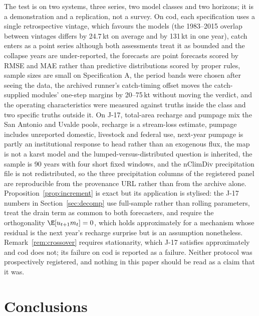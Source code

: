 The test is on two systems, three series, two model classes and two horizons; it is a demonstration and a replication, not a survey. On cod, each specification uses a single retrospective vintage, which favours the models (the 1983--2015 overlap between vintages differs by 24.7\,kt on average and by 131\,kt in one year), catch enters as a point series although both assessments treat it as bounded and the collapse years are under-reported, the forecasts are point forecasts scored by RMSE and MAE rather than predictive distributions scored by proper rules, sample sizes are small on Specification A, the period bands were chosen after seeing the data, the archived runner's catch-timing offset moves the catch-supplied modules' one-step margins by 20--75\,kt without moving the verdict, and the operating characteristics were measured against truths inside the class and two specific truths outside it. On J-17, total-area recharge and pumpage mix the San Antonio and Uvalde pools, recharge is a stream-loss estimate, pumpage includes unreported domestic, livestock and federal use, next-year pumpage is partly an institutional response to head rather than an exogenous flux, the map is not a karst model and the lumped-versus-distributed question is inherited, the sample is 90 years with four short fixed windows, and the nClimDiv precipitation file is not redistributed, so the three precipitation columns of the registered panel are reproducible from the provenance URL rather than from the archive alone. Proposition~\ref{prop:increment} is exact but its application is stylised: the J-17 numbers in Section~\ref{sec:decomp} use full-sample rather than rolling parameters, treat the drain term as common to both forecasters, and require the orthogonality $\E[u_{t+1}m_t]=0$, which holds approximately for a mechanism whose residual is the next year's recharge surprise but is an assumption nonetheless. Remark~\ref{rem:crossover} requires stationarity, which J-17 satisfies approximately and cod does not; its failure on cod is reported as a failure. Neither protocol was prospectively registered, and nothing in this paper should be read as a claim that it was.

\section{Conclusions}\label{sec:conclusions}

